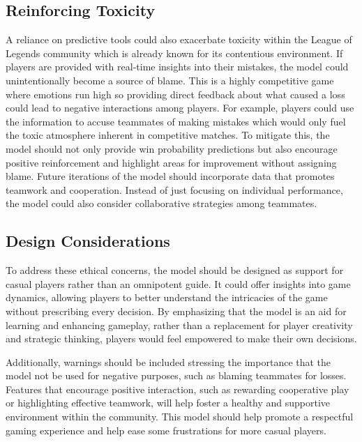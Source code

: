 \documentclass[10pt,twocolumn]{article}
\begin{document}
\subsection{Reinforcing Toxicity}
A reliance on predictive tools could also exacerbate toxicity within the League of Legends community which is already known for its contentious environment. If players are provided with real-time insights into their mistakes, the model could unintentionally become a source of blame. This is a highly competitive game where emotions run high so providing direct feedback about what caused a loss could lead to negative interactions among players. For example, players could use the information to accuse teammates of making mistakes which would only fuel the toxic atmosphere inherent in competitive matches. To mitigate this, the model should not only provide win probability predictions but also encourage positive reinforcement and highlight areas for improvement without assigning blame. Future iterations of the model should incorporate data that promotes teamwork and cooperation. Instead of just focusing on individual performance, the model could also consider collaborative strategies among teammates.

\subsection{Design Considerations}
To address these ethical concerns, the model should be designed as support for casual players rather than an omnipotent guide. It could offer insights into game dynamics, allowing players to better understand the intricacies of the game without prescribing every decision. By emphasizing that the model is an aid for learning and enhancing gameplay, rather than a replacement for player creativity and strategic thinking, players would feel empowered to make their own decisions.

Additionally, warnings should be included stressing the importance that the model not be used for negative purposes, such as blaming teammates for losses. Features that encourage positive interaction, such as rewarding cooperative play or highlighting effective teamwork, will help foster a healthy and supportive environment within the community. This model should help promote a respectful gaming experience and help ease some frustrations for more casual players.
\end{document}

